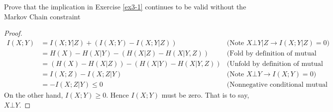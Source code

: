 \begin{exercise}[]{Prove that the implication in Exercise \ref{ex3-1} continues to be valid without the Markov Chain constraint}
  \begin{proof}
    \begin{equation}
      \begin{array}{rll}
        I(X;Y) &= I(X;Y|Z) + (I(X;Y) - I(X;Y|Z)) & \text{(Note } X \bot Y|Z \rightarrow I(X;Y|Z) = 0 \text{)}\\[2mm]
        &= H(X) - H(X|Y) - (H(X|Z) - H(X|Y,Z)) & \text{(Fold by definition of mutual information)}\\[2mm]
        &= (H(X) - H(X|Z)) - (H(X|Y)- H(X|Y,Z)) & \text{(Unfold by definition of mutual information)}\\[2mm]
        &= I(X;Z) - I(X;Z|Y) &  \text{(Note } X \bot Y \rightarrow I(X;Y) = 0 \text{)} \\[2mm]
        &= - I(X;Z|Y) \le 0 & \text{(Nonnegative conditional mutual information)} 
      \end{array}
    \end{equation}
    On the other hand, $I(X;Y) \ge 0$. Hence $I(X;Y)$ must be zero. That is to say, $X \bot Y$.
  \end{proof}
  \end{exercise}

